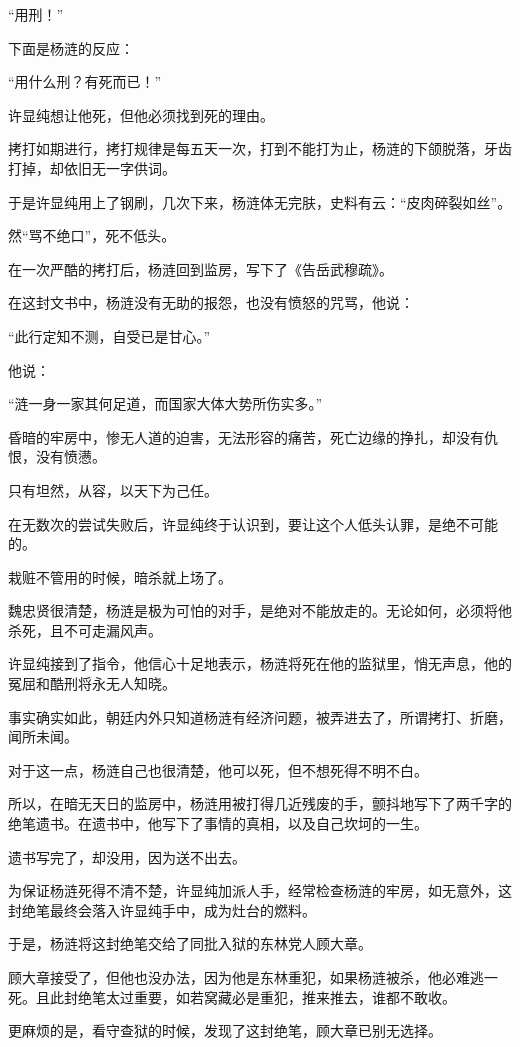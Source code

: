\begin{multicols}{\theparacolNo}
“用刑！”

下面是杨涟的反应：

“用什么刑？有死而已！”

许显纯想让他死，但他必须找到死的理由。

拷打如期进行，拷打规律是每五天一次，打到不能打为止，杨涟的下颌脱落，牙齿打掉，却依旧无一字供词。

于是许显纯用上了钢刷，几次下来，杨涟体无完肤，史料有云：“皮肉碎裂如丝”。

然“骂不绝口”，死不低头。

在一次严酷的拷打后，杨涟回到监房，写下了《告岳武穆疏》。

在这封文书中，杨涟没有无助的报怨，也没有愤怒的咒骂，他说：

“此行定知不测，自受已是甘心。”

他说：

“涟一身一家其何足道，而国家大体大势所伤实多。”

昏暗的牢房中，惨无人道的迫害，无法形容的痛苦，死亡边缘的挣扎，却没有仇恨，没有愤懑。

只有坦然，从容，以天下为己任。

在无数次的尝试失败后，许显纯终于认识到，要让这个人低头认罪，是绝不可能的。

栽赃不管用的时候，暗杀就上场了。

魏忠贤很清楚，杨涟是极为可怕的对手，是绝对不能放走的。无论如何，必须将他杀死，且不可走漏风声。

许显纯接到了指令，他信心十足地表示，杨涟将死在他的监狱里，悄无声息，他的冤屈和酷刑将永无人知晓。

事实确实如此，朝廷内外只知道杨涟有经济问题，被弄进去了，所谓拷打、折磨，闻所未闻。

对于这一点，杨涟自己也很清楚，他可以死，但不想死得不明不白。

所以，在暗无天日的监房中，杨涟用被打得几近残废的手，颤抖地写下了两千字的绝笔遗书。在遗书中，他写下了事情的真相，以及自己坎坷的一生。

遗书写完了，却没用，因为送不出去。

为保证杨涟死得不清不楚，许显纯加派人手，经常检查杨涟的牢房，如无意外，这封绝笔最终会落入许显纯手中，成为灶台的燃料。

于是，杨涟将这封绝笔交给了同批入狱的东林党人顾大章。

顾大章接受了，但他也没办法，因为他是东林重犯，如果杨涟被杀，他必难逃一死。且此封绝笔太过重要，如若窝藏必是重犯，推来推去，谁都不敢收。

更麻烦的是，看守查狱的时候，发现了这封绝笔，顾大章已别无选择。


\end{multicols}
